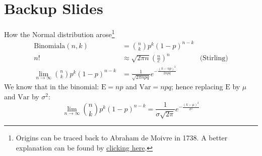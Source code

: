 \documentclass[aspectratio=169]{beamer}                    %
\begin{document}
\section*{Backup Slides}
\begin{frame}[plain, noframenumbering, label=appendixnormal]{How the Normal
		distribution arose\footnote{Origins can be traced back to
			Abraham de Moivre in 1738.
			A better explanation can be found by
			\href{http://www.stat.yale.edu/~pollard/Courses/241.fall2014/notes2014/Bin.Normal.pdf}{clicking here}.}}
	$$
		\begin{aligned}
			\text{Binomiala}(n, k)                           & = \binom{n}{k} p^k (1-p)^{n-k}                                                \\
			n!                                               & \approx \sqrt{2 \pi n} \left(\frac{n}{e}\right)^n         & \text{(Stirling)} \\
			\lim_{n \to \infty} \binom{n}{k} p^k (1-p)^{n-k} & = \frac{1}{\sqrt{2 \pi npq}} e^{-\frac{(k - np)^2}{2npq}}
		\end{aligned}
	$$
	We know that in the binomial: $\mathrm{E} = np$ and $\mathrm{Var} = npq$; hence replacing $\mathrm{E}$ by $\mu$ and $\mathrm{Var}$ by $\sigma^2$:
	$$\lim_{n \to \infty} \binom{n}{k} p^k (1-p)^{n-k} = \frac{1}{\sigma \sqrt{2 \pi}} e^{-\frac{(k - \mu)^2}{\sigma^2}}$$
\end{frame}
\end{document}
